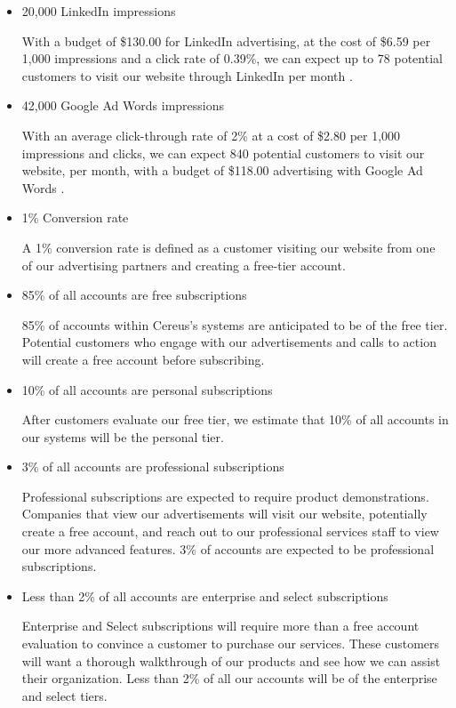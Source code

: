 \begin{itemize}

\item 20,000 LinkedIn impressions

With a budget of \$130.00 for LinkedIn advertising, at the cost of \$6.59 per 1,000 impressions and a click rate of 0.39\%, we can expect up to 78 potential customers to visit our website through LinkedIn per month \cite{wilcox.2020}.

\item 42,000 Google Ad Words impressions

With an average click-through rate of 2\% at a cost of \$2.80 per 1,000 impressions and clicks, we can expect 840 potential customers to visit our website, per month, with a budget of \$118.00 advertising with Google Ad Words \cite{adstag.2020}.

\item 1\% Conversion rate

A 1\% conversion rate is defined as a customer visiting our website from one of our advertising partners and creating a free-tier account.

\item 85\% of all accounts are free subscriptions

85\% of accounts within Cereus's systems are anticipated to be of the free tier. Potential customers who engage with our advertisements and calls to action will create a free account before subscribing.

\item 10\% of all accounts are personal subscriptions

After customers evaluate our free tier, we estimate that 10\% of all accounts in our systems will be the personal tier.

\item 3\% of all accounts are professional subscriptions

Professional subscriptions are expected to require product demonstrations. Companies that view our advertisements will visit our website, potentially create a free account, and reach out to our professional services staff to view our more advanced features. 3\% of accounts are expected to be professional subscriptions. 

\item Less than 2\% of all accounts are enterprise and select subscriptions

Enterprise and Select subscriptions will require more than a free account evaluation to convince a customer to purchase our services. These customers will want a thorough walkthrough of our products and see how we can assist their organization. Less than 2\% of all our accounts will be of the enterprise and select tiers.

\end{itemize}

